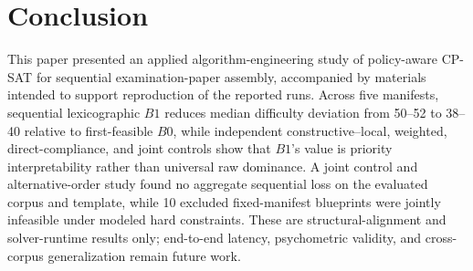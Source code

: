 \documentclass[runningheads]{llncs}
\begin{document}
\section{Conclusion}
\label{sec:conclusion}

This paper presented an applied algorithm-engineering study of policy-aware CP-SAT for sequential examination-paper assembly, accompanied by materials intended to support reproduction of the reported runs. Across five manifests, sequential lexicographic $B1$ reduces median difficulty deviation from 50--52 to 38--40 relative to first-feasible $B0$, while independent constructive--local, weighted, direct-compliance, and joint controls show that $B1$'s value is priority interpretability rather than universal raw dominance. A joint control and alternative-order study found no aggregate sequential loss on the evaluated corpus and template, while 10 excluded fixed-manifest blueprints were jointly infeasible under modeled hard constraints. These are structural-alignment and solver-runtime results only; end-to-end latency, psychometric validity, and cross-corpus generalization remain future work.
\end{document}
